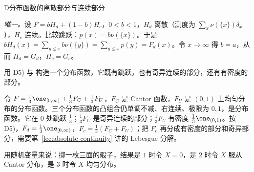 \begin{probleme}{D}{分布函数的离散部分与连续部分}
\begin{questions}
\begin{solution}
\emph{唯一。}设 $F=bH_d+(1-b)H_c$，$0<b<1$，$H_d$ 离散（测度为 $\sum_x\nu(\{x\})\delta_x$），$H_c$ 连续。比较跳跃：$p(x)=b\nu(\{x\})$。于是 $bH_d(x)=\sum_{y\leqslant x}b\nu(\{y\})=\sum_{y\leqslant x}p(y)=F_d(x)$。令 $x\to\infty$ 得 $b=a$，从而 $H_d=G_d$，$H_c=G_c$。
\end{solution}
\item 用 D5) 与 构造一个分布函数，它既有跳跃，也有奇异连续的部分，还有有密度的部分。
\begin{solution}
令 $F=\frac13\one_{[0,\infty)}+\frac13F_C+\frac13F_U$，$F_C$ 是 Cantor 函数，$F_U$ 是 $(0,1)$ 上均匀分布的分布函数。三个分布函数的凸组合仍单调不减、右连续、极限为 $0,1$，是分布函数。它在 $0$ 处跳跃 $\frac13$；$\frac13F_C$ 是奇异连续的部分；$\frac13F_U$ 有密度 $\frac13\one_{(0,1)}$。按 D5)，$F_d=\frac13\one_{[0,\infty)}$，$F_c=\frac13(F_C+F_U)$；把 $F_c$ 再分成有密度的部分和奇异部分，需要第~\ref{lec:absolute-continuity} 讲的 Lebesgue 分解。

用随机变量来说：掷一枚三面的骰子，结果是 $1$ 时令 $X=0$，是 $2$ 时令 $X$ 服从 Cantor 分布，是 $3$ 时令 $X$ 均匀分布。
\end{solution}
\end{questions}
\end{probleme}

\thinkingpart

